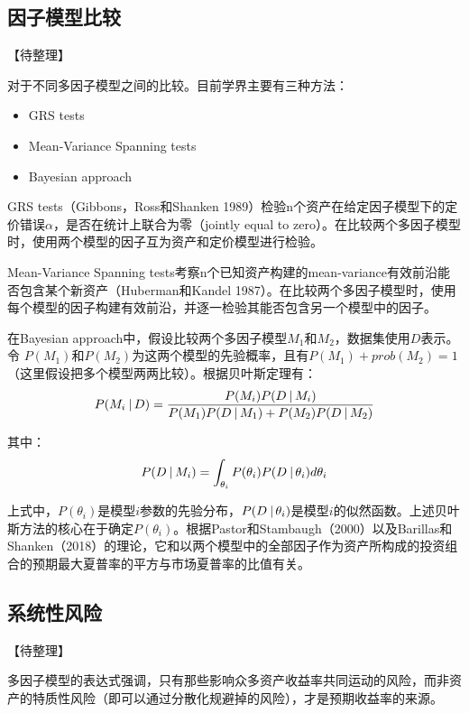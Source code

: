 \documentclass[11pt]{article}
\begin{document}
\subsection{因子模型比较}

【待整理】

对于不同多因子模型之间的比较。目前学界主要有三种方法：
\begin{itemize}
    \item GRS tests
    \item Mean-Variance Spanning tests
    \item Bayesian approach
\end{itemize}

GRS tests（Gibbons，Ross和Shanken 1989）检验n个资产在给定因子模型下的定价错误$\alpha$，是否在统计上联合为零（jointly equal to zero）。在比较两个多因子模型时，使用两个模型的因子互为资产和定价模型进行检验。

Mean-Variance Spanning tests考察n个已知资产构建的mean-variance有效前沿能否包含某个新资产（Huberman和Kandel 1987）。在比较两个多因子模型时，使用每个模型的因子构建有效前沿，并逐一检验其能否包含另一个模型中的因子。

在Bayesian approach中，假设比较两个多因子模型$M_1$和$M_2$，数据集使用$D$表示。令 $P(M_1)$和$P(M_2)$为这两个模型的先验概率，且有$P(M_1) + prob(M_2) = 1$（这里假设把多个模型两两比较）。根据贝叶斯定理有：
\begin{equation*}
    P(M_i \:\vert\, D) = \frac{P(M_i)P(D \:\vert\, M_i)}{P(M_1)P(D\:\vert\, M_1) + P(M_2)P(D\:\vert\, M_2)}
\end{equation*}

其中：
\begin{equation*}
    P(D \:\vert\, M_i) = \int_{\theta_i} P(\theta_i) P(D \:\vert\, \theta_i) d\theta_i
\end{equation*}

上式中，$P(\theta_i)$是模型$i$参数的先验分布，$P(D \:\vert\, \theta_i)$是模型$i$的似然函数。上述贝叶斯方法的核心在于确定$P(\theta_i)$。根据Pastor和Stambaugh（2000）以及Barillas和Shanken（2018）的理论，它和以两个模型中的全部因子作为资产所构成的投资组合的预期最大夏普率的平方与市场夏普率的比值有关。

\subsection{系统性风险}

【待整理】

多因子模型的表达式强调，只有那些影响众多资产收益率共同运动的风险，而非资产的特质性风险（即可以通过分散化规避掉的风险），才是预期收益率的来源。
\end{document}
